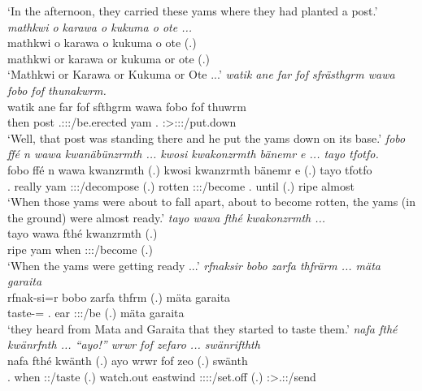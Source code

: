 \begin{exe}
	\trans `In the afternoon, they carried these yams where they had planted a post.'
	\emph{mathkwi o karawa o kukuma o ote ...}\\
	\gll mathkwi o karawa o kukuma o ote (.)\\ 
	mathkwi or karawa or kukuma or ote (.)\\
	\trans `Mathkwi or Karawa or Kukuma or Ote ...'
	\emph{watik ane far fof sfrästhgrm wawa fobo fof thunakwrm.}\\
	\gll watik ane far fof sfthgrm wawa fobo fof thuwrm\\ 
	then {\Dem} post {\Emph} \Tsg.\Masc:\Sbj:\Pst:\Dur/be.erected yam \Dist.{\All} {\Emph} \Sg:\Sbj>\Stpl:\Obj:\Pst:\Dur/put.down\\
	\trans `Well, that post was standing there and he put the yams down on its base.'
	\emph{fobo ffé n wawa kwanäbünzrmth ... kwosi kwakonzrmth bänemr e ... tayo tfotfo.}\\
	\gll fobo ffé n wawa kwanzrmth (.) kwosi kwanzrmth bänemr e (.) tayo tfotfo\\ 
	\Dist.{\All} really {\Imn} yam \Stpl:\Sbj:\Pst:\Dur/decompose (.) rotten \Stpl:\Sbj:\Pst:\Dur/become \Recog.{\Purp} until (.) ripe almost\\
	\trans `When those yams were about to fall apart, about to become rotten, the yams (in the ground) were almost ready.'
	\emph{tayo wawa fthé kwakonzrmth ...}\\
	\gll tayo wawa fthé kwanzrmth (.)\\ 
	ripe yam when \Stpl:\Sbj:\Pst:\Dur/become (.)\\
	\trans `When the yams were getting ready ...'
	\emph{rfnaksir bobo zarfa thfrärm ... mäta garaita}\\
	\gll rfnak-si=r bobo zarfa thfrm (.) mäta garaita\\ 
	taste-\Nmlz={\Purp} \Med.{\All} ear \Stpl:\Sbj:\Pst:\Dur/be (.) mäta garaita\\
	\trans `they heard from Mata and Garaita that they started to taste them.'
	\emph{nafa fthé kwänrfnth ... ``ayo!'' wrwr fof zefaro ... swänrifthth}\\
	\gll nafa fthé kwänth (.) ayo wrwr fof zeo (.) swänth\\ 
	\Tnsg.{\Erg} when \Stpl:\Sbj:\Iter/taste (.) watch.out eastwind {\Emph} \Sg:\Sbj:\Pst:\Pfv:\Andat/set.off (.) \Stpl:\Sbj>\Tsg.\Masc:\Obj:\Iter/send\\

\end{exe}

